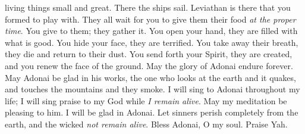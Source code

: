 \begin{biblechapter}
living things small and great.
\verse There the ships sail. 
Leviathan is there that you formed to play with.
\verse They all wait for you 
to give them their food \textit{at the proper time}.
\verse You give to them; they gather it. 
You open your hand, they are filled with what is good.
\verse You hide your face, they are terrified. 
You take away their breath, they die 
and return to their dust.
\verse You send forth your Spirit, they are created, 
and you renew the face of the ground.
\verse May the glory of Adonai endure forever. 
May Adonai be glad in his works,
\verse the one who looks at the earth and it quakes, 
and touches the mountains and they smoke.
\verse I will sing to Adonai throughout my life; 
I will sing praise to my God while \textit{I remain alive}.
\verse May my meditation be pleasing to him. 
I will be glad in Adonai.
\verse Let sinners perish completely from the earth, 
and the wicked \textit{not remain alive}. 
Bless Adonai, O my soul. 
Praise Yah.
\end{biblechapter}

